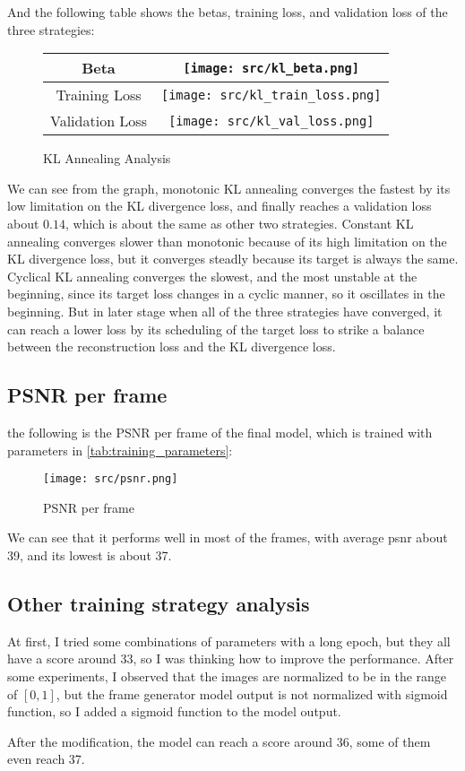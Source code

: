 And the following table shows the betas, training loss, and validation loss of the three strategies:
\begin{figure}[H]
    \centering
    \begin{tabular}{|c|c|}
        \hline
        Beta & \texttt{[image: src/kl\_beta.png]} \\
        \hline
        Training Loss & \texttt{[image: src/kl\_train\_loss.png]} \\
        \hline
        Validation Loss & \texttt{[image: src/kl\_val\_loss.png]} \\
        \hline
    \end{tabular}
    \caption{KL Annealing Analysis}
\end{figure}

We can see from the graph, monotonic KL annealing converges the fastest by its low limitation on the KL divergence loss, and finally reaches a validation loss about $0.14$, which is about the same as other two strategies.
Constant KL annealing converges slower than monotonic because of its high limitation on the KL divergence loss, but it converges steadly because its target is always the same.
Cyclical KL annealing converges the slowest, and the most unstable at the beginning, since its target loss changes in a cyclic manner, so it oscillates in the beginning. But in later stage when all of the three strategies have converged, it can reach a lower loss by its scheduling of the target loss to strike a balance between the reconstruction loss and the KL divergence loss.


\subsection{PSNR per frame}
the following is the PSNR per frame of the final model, which is trained with parameters in \ref{tab:training_parameters}:

\begin{figure}[H]
    \centering
    \texttt{[image: src/psnr.png]}
    \caption{PSNR per frame}
\end{figure}

We can see that it performs well in most of the frames, with average psnr about 39, and its lowest is about 37.

\subsection{Other training strategy analysis}
At first, I tried some combinations of parameters with a long epoch, but they all have a score around 33, so I was thinking how to improve the performance.
After some experiments, I observed that the images are normalized to be in the range of $[0, 1]$, but the frame generator model output is not normalized with sigmoid function, so I added a sigmoid function to the model output.

After the modification, the model can reach a score around 36, some of them even reach 37.
